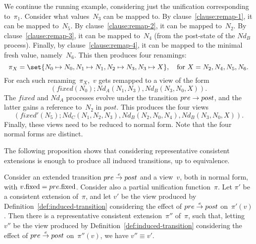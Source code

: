 
\begin{example}
We continue the running example, considering just the unification
corresponding to~$\pi_1$.  Consider what values~$N_3$ can be mapped to.  By
clause~\ref{clause:remap-1}, it can be mapped to~$N_5$.  By
clause~\ref{clause:remap-2}, it can be mapped to~$N_2$.  By
clause~\ref{clause:remap-3}, it can be mapped to~$N_4$ (from the post-state of
the $Nd_B$ process).  Finally, by clause~\ref{clause:remap-4}, it can be
mapped to the minimal fresh value, namely~$N_6$.
%
This then produces four renamings:
\[
\pi_X = \set{N_0 \mapsto N_0, N_1 \mapsto N_1, N_2 \mapsto N_3, N_3 \mapsto X},
\quad \mbox{for $X = N_2, N_4, N_5, N_6$}.
\]
For each such renaming~$\pi_X$,\, $v$ gets remapped to a view of the form
\[
(fixed(N_0); Nd_A(N_1, N_3), Nd_B(N_3, N_0, X)).
\]
The $fixed$ and $Nd_A$ processes evolve under the transition \( pre
\stackrel{}\rightarrow post \), and the latter gains a reference to~$N_2$ in
$post$.  This produces the four views
\[
(fixed'(N_5); Nd_C(N_1, N_2, N_3), Nd_B(N_2, N_0, N_4), Nd_B(N_3, N_0, X)).
\]
Finally, these views need to be reduced to normal form.  Note that the four
normal forms are distinct.
\end{example}


The following proposition shows that considering representative consistent
extensions is enough to produce all induced transitions, up to equivalence. 
%
\begin{prop}
\label{prop:unifying-renaming}
Consider an extended transition $pre \stackrel{e}\rightarrow post$ and a view~$v$, both in
normal form, with $v.\mathrm{fixed} = pre.\mathrm{fixed}$.  Consider also a partial
unification function~$\pi$.
%
Let $\pi'$ be a consistent extension of~$\pi$, and
let $v'$ be the view produced by Definition~\ref{def:induced-transition}
considering the effect of $pre \stackrel{e}\rightarrow post$ on~$\pi'(v)$.  
%
Then there is a representative consistent extension~$\pi''$ of~$\pi$, such
that, letting $v''$ be the view produced by
Definition~\ref{def:induced-transition} considering the effect of $pre
\stackrel{e}\rightarrow post$ on~$\pi''(v)$, we have $v'' \equiv v'$.
\end{prop}


